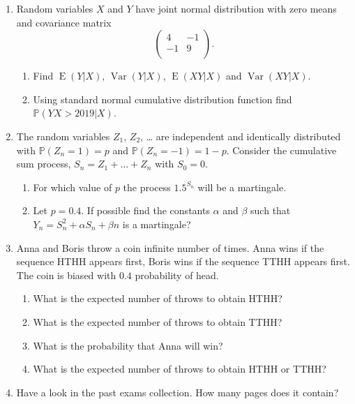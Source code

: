 \documentclass[12pt]{article}
\DeclareMathOperator{\Var}{Var}
\DeclareMathOperator{\E}{E}
\def \P{\mathbb{P}}
\begin{document}
\begin{enumerate}
\item Random variables $X$ and $Y$ have joint normal distribution with zero means and covariance matrix
\[
\begin{pmatrix}
4 & -1 \\
-1 & 9 \\
\end{pmatrix}.
\]

\begin{enumerate}
  \item Find $\E(Y|X)$, $\Var(Y|X)$, $\E(XY|X)$ and $\Var(XY|X)$.
  \item Using standard normal cumulative distribution function find $\P(YX > 2019 | X)$.
\end{enumerate}


\item The random variables $Z_1$, $Z_2$, \ldots{}  are independent and identically distributed with 
$\P(Z_n = 1) = p$ and $\P(Z_n = -1) = 1-p$. Consider the cumulative sum process, $S_n = Z_1 + \ldots + Z_n$ with $S_0=0$.

\begin{enumerate}
  \item For which value of $p$ the process $1.5^{S_n}$ will be a martingale.
  \item Let $p=0.4$. 
  If possible find the constants $\alpha$ and $\beta$ such that $Y_n = S_n^2 + \alpha S_n + \beta n$ is a martingale?
\end{enumerate}

\item Anna and Boris throw a coin infinite number of times.
Anna wins if the sequence HTHH appears first, Boris wins if the sequence TTHH appears first. 
The coin is biased with $0.4$ probability of head.

\begin{enumerate}
  \item What is the expected number of throws to obtain HTHH? 
  \item What is the expected number of throws to obtain TTHH?
  \item What is the probability that Anna will win?
  \item What is the expected number of throws to obtain HTHH or TTHH?
\end{enumerate}

\item Have a look in the past exams collection. How many pages does it contain?


\end{enumerate}
\end{document}
